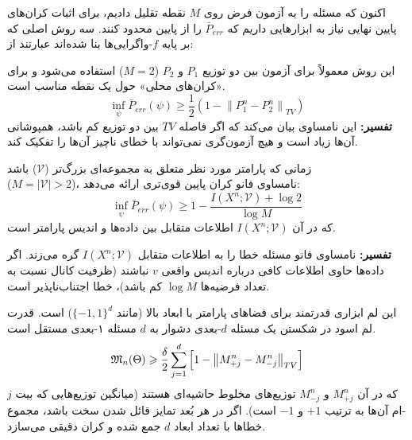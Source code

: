 اکنون که مسئله را به آزمون فرض روی $M$ نقطه تقلیل دادیم، برای اثبات کران‌های پایین نهایی نیاز به ابزارهایی داریم که $\bar{P}_{err}$ را از پایین محدود کنند. سه روش اصلی که بر پایه $f$-واگرایی‌ها بنا شده‌اند عبارتند از:

\begin{قضیه}
\label{thm:le-cam}
این روش معمولاً برای آزمون بین دو توزیع $P_1$ و $P_2$ ($M=2$) استفاده می‌شود و برای «کران‌های محلی» حول یک نقطه مناسب است.
\begin{equation}
\label{eq:le-cam}
\inf_{\psi} \bar{P}_{err}(\psi) \ge \frac{1}{2} \left( 1 - \left\|P_1^n - P_2^n\right\|_{TV} \right)
\end{equation}
\textbf{تفسیر:} این نامساوی بیان می‌کند که اگر فاصله $TV$ بین دو توزیع کم باشد، همپوشانی آن‌ها زیاد است و هیچ آزمون‌گری نمی‌تواند با خطای ناچیز آن‌ها را تفکیک کند.
\end{قضیه}

\begin{قضیه}
\label{thm:fano}
زمانی که پارامتر مورد نظر متعلق به مجموعه‌ای بزرگ‌تر ($\mathcal{V}$) باشد \\ ($M = |\mathcal{V}| > 2$)، نامساوی فانو کران پایین قوی‌تری ارائه می‌دهد:
\begin{equation}
\label{eq:fano}
\inf_{\psi} \bar{P}_{err}(\psi) \ge 1 - \frac{I\left(X^n; \mathcal{V}\right) + \log 2}{\log M}
\end{equation}
که در آن $I(X^n; \mathcal{V})$ اطلاعات متقابل بین داده‌ها و اندیس پارامتر است.

\textbf{تفسیر:} نامساوی فانو مسئله خطا را به اطلاعات متقابل $I(X^n; \mathcal{V})$ گره می‌زند. اگر داده‌ها حاوی اطلاعات کافی درباره اندیس واقعی ${v}$ نباشند (ظرفیت کانال نسبت به تعداد فرضیه‌ها $\log M$ کم باشد)، خطا اجتناب‌ناپذیر است.
\end{قضیه}

\begin{لم}
\label{lem:assouad}
این لم ابزاری قدرتمند برای فضاهای پارامتر با ابعاد بالا (مانند $\{-1, 1\}^d$) است. قدرت لم اسود در شکستن یک مسئله $d$-بعدی دشوار به $d$ مسئله ۱-بعدی مستقل است.
\begin{equation}
\label{eq:assouad}
\mathfrak{M}_n(\Theta) \geqslant \frac{\delta}{2} \sum_{j=1}^d \left[ 1 - \left\|M_{+j}^n - M_{-j}^n\right\|_{TV} \right]
\end{equation}
که در آن $M_{+j}^n$ و $M_{-j}^n$ توزیع‌های مخلوط حاشیه‌ای هستند (میانگین توزیع‌هایی که بیت $j$-ام آن‌ها به ترتیب $+1$ و $-1$ است). اگر در هر بُعد تمایز قائل شدن سخت باشد، مجموع خطاها با تعداد ابعاد $d$ جمع شده و کران دقیقی می‌سازد.
\end{لم}